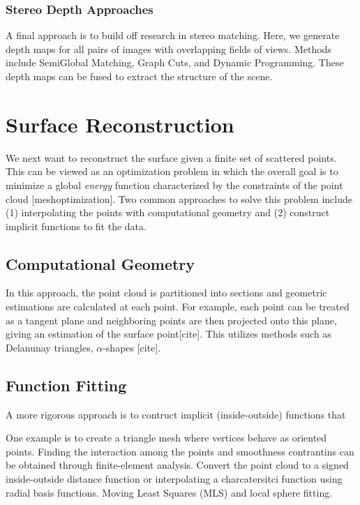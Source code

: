 \documentclass[10pt,twocolumn,letterpaper]{article}
\begin{document}
\subsubsection{Stereo Depth Approaches}

A final approach is to build off research in stereo matching. Here, we generate depth maps for all pairs of images with overlapping fields of views. Methods include SemiGlobal Matching, Graph Cuts, and Dynamic Programming.\cite{sgm,taxonomy} These depth maps can be fused to extract the structure of the scene.\cite{fuse}


\section{Surface Reconstruction}
We next want to reconstruct the surface given a finite set of scattered points.  This can be viewed as an optimization problem in which the overall goal is to minimize a global \textit{energy} function characterized by the constraints of the point cloud [meshoptimization].  Two common approaches to solve this problem include (1) interpolating the points with computational geometry and (2) construct implicit functions to fit the data.

\subsection{ Computational Geometry }
In this approach, the point cloud is partitioned into sections and geometric estimations are calculated at each point. For example, each point can be treated as a tangent plane and neighboring points are then projected onto this plane, giving an estimation of the surface point[cite].  This utilizes methods such as Delanunay triangles, $\alpha$-shapes [cite]. 

\subsection{ Function Fitting }
A more rigorous approach is to contruct implicit (inside-outside) functions that 

One example is to create a triangle mesh where vertices behave as oriented points.  Finding the interaction among the points and smoothness contrantins can be obtained through finite-element analysis.    Convert the point cloud to a signed inside-outside distance function  or interpolating a charcatersitci function using radial basis functions.  Moving Least Squares (MLS) and local sphere fitting.
\end{document}
